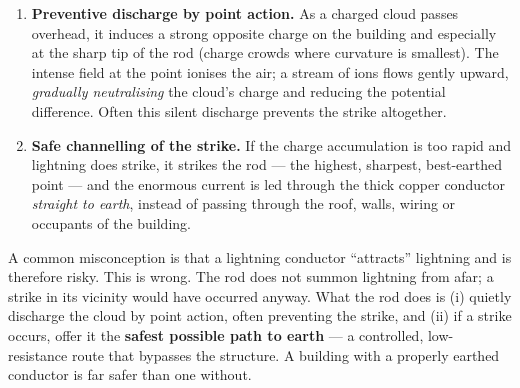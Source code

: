 \documentclass[11pt]{article}
\begin{document}
\begin{methode}
\begin{enumerate}
\item \textbf{Preventive discharge by point action.} As a charged cloud passes overhead, it induces a strong opposite charge on the building and especially at the sharp tip of the rod (charge crowds where curvature is smallest). The intense field at the point ionises the air; a stream of ions flows gently upward, \emph{gradually neutralising} the cloud's charge and reducing the potential difference. Often this silent discharge prevents the strike altogether.
\item \textbf{Safe channelling of the strike.} If the charge accumulation is too rapid and lightning does strike, it strikes the rod — the highest, sharpest, best-earthed point — and the enormous current is led through the thick copper conductor \emph{straight to earth}, instead of passing through the roof, walls, wiring or occupants of the building.
\end{enumerate}
\end{methode}

\begin{attention}
A common misconception is that a lightning conductor ``attracts'' lightning and is therefore risky. This is wrong. The rod does not summon lightning from afar; a strike in its vicinity would have occurred anyway. What the rod does is (i) quietly discharge the cloud by point action, often preventing the strike, and (ii) if a strike occurs, offer it the \textbf{safest possible path to earth} — a controlled, low-resistance route that bypasses the structure. A building with a properly earthed conductor is far safer than one without.
\end{attention}
\end{document}
